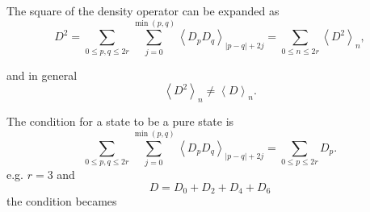 \documentclass[aps,preprint]{revtex4}%
\begin{document}
The square of the density operator can be expanded as%
\begin{equation}
D^{2}=\sum_{0\leq p,q\leq2r}\sum_{j=0}^{\min\left(  p,q\right)  }\left\langle
D_{p}D_{q}\right\rangle _{\left\vert p-q\right\vert +2j}=\sum_{0\leq n\leq
2r}\left\langle D^{2}\right\rangle _{n},
\end{equation}


and in general
\begin{equation}
\left\langle D^{2}\right\rangle _{n}\neq\left\langle D\right\rangle _{n}.
\end{equation}


The condition for a state to be a pure state is
\begin{equation}
\sum_{0\leq p,q\leq2r}\sum_{j=0}^{\min\left(  p,q\right)  }\left\langle
D_{p}D_{q}\right\rangle _{\left\vert p-q\right\vert +2j}=\sum_{0\leq p\leq
2r}D_{p}.
\end{equation}
e.g. $r=3$ and
\begin{equation}
D=D_{0}+D_{2}+D_{4}+D_{6}%
\end{equation}
the condition becames
\end{document}
